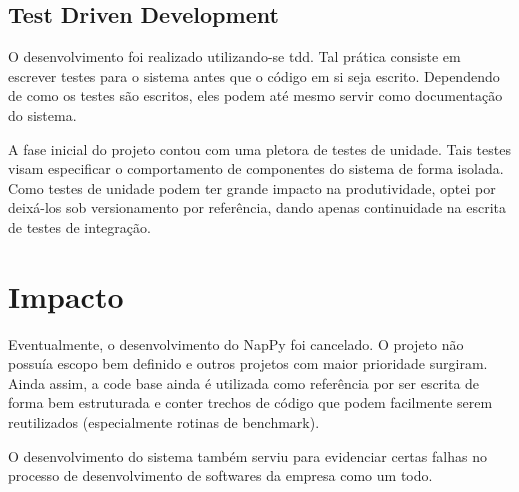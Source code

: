 \subsection{Test Driven Development}

O desenvolvimento foi realizado utilizando-se
\gls{tdd}. Tal prática consiste em escrever
testes para o sistema antes que o código em si seja escrito.
Dependendo de como os testes são escritos, eles podem até mesmo
servir como documentação do sistema.

A fase inicial do projeto contou com uma pletora de testes de
unidade. Tais testes visam especificar o comportamento de
componentes do sistema de forma isolada. Como testes de unidade
podem ter grande impacto na
produtividade\cite{Coplien}, optei por deixá-los
sob versionamento por referência, dando apenas continuidade na
escrita de testes de integração.



\section{Impacto}

Eventualmente, o desenvolvimento do NapPy foi cancelado. O
projeto não possuía escopo bem definido e outros projetos com
maior prioridade surgiram. Ainda assim, a code base ainda é
utilizada como referência por ser escrita de forma bem
estruturada e conter trechos de código que podem facilmente serem
reutilizados (especialmente rotinas de benchmark).

O desenvolvimento do sistema também serviu para evidenciar certas
falhas no processo de desenvolvimento de softwares da empresa
como um todo.

